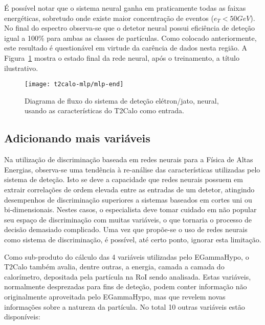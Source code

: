 É possível notar que o sistema neural ganha em praticamente todas as faixas
energéticas, sobretudo onde existe maior concentração de eventos ($e_T<50
GeV$). No final do espectro observa-se que o detetor neural possui eficiência
de deteção igual a 100\% para ambas as classes de partículas. Como colocado
anteriormente, este resultado é questionável em virtude da carência de dados
nesta região. A Figura~\ref{fig:t2calo-mlp-best-net} mostra o estado final da
rede neural, após o treinamento, a título ilustrativo.

\begin{figure}
\begin{center}
\begin{sideways}
\texttt{[image: t2calo-mlp/mlp-end]}
\end{sideways}
\end{center}
\caption{Diagrama de fluxo do sistema de deteção elétron/jato, neural, usando as
características do T2Calo como entrada.}
\label{fig:t2calo-mlp-best-net}
\end{figure}

\subsection{Adicionando mais variáveis}

Na utilização de discriminação baseada em redes neurais para a Física de Altas
Energias, observa-se uma tendência à re-análise das características utilizadas
pelo sistema de deteção. Isto se deve a capacidade que redes neurais possuem
em extrair correlações de ordem elevada entre as entradas de um detetor,
atingindo desempenhos de discriminação superiores a sistemas baseados em
cortes uni ou bi-dimensionais. Nestes casos, o especialista deve tomar cuidado
em não popular seu espaço de discriminação com muitas variáveis, o que
tornaria o processo de decisão demasiado complicado. Uma vez que propõe-se o
uso de redes neurais como sistema de discriminação, é possível, até certo
ponto, ignorar esta limitação.

Como sub-produto do cálculo das 4 variáveis utilizadas pelo EGammaHypo, o
T2Calo também avalia, dentre outras, a energia, camada a camada do
calorímetro, depositada pela partícula na RoI sendo analisada. Estas
variáveis, normalmente desprezadas para fins de deteção, podem conter
informação não originalmente aproveitada pelo EGammaHypo, mas que revelem
novas informações sobre a natureza da partícula. No total 10 outras variáveis
estão disponíveis:

